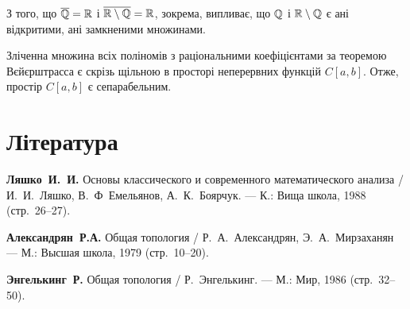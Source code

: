 З того, що $\overline{\mathbb{Q}} = \mathbb{R}$ і $\overline{\mathbb{R} \setminus \mathbb{Q}} = \mathbb{R}$,
зокрема, випливає, що $\mathbb{Q}$ і $\mathbb{R} \setminus \mathbb{Q}$
є ані відкритими, ані замкненими множинами.

\begin{example}
Зліченна множина всіх поліномів з
раціональними коефіцієнтами за теоремою Вєйєрштрасса є
скрізь щільною в просторі неперервних функцій $C[a, b]$.
Отже, простір $C[a, b]$ є сепарабельним.
\end{example}

\section{Література}

\begin{enumerate}[label={[\arabic*]}]
\item \textbf{Ляшко~И.~И.}
Основы классического и современного математического анализа /
И.~И.~Ляшко, В.~Ф~Емельянов, А.~К.~Боярчук. ---
К.: Вища школа, 1988 (стр.~26--27).
\item \textbf{Александрян~Р.А.}
Общая топология /
Р.~А.~Александрян, Э.~А.~Мирзаханян ---
М.: Высшая школа, 1979 (стр.~10--20).
\item \textbf{Энгелькинг~Р.}
Общая топология /
Р.~Энгелькинг. ---
М.: Мир, 1986 (стр.~32--50).
\end{enumerate}
